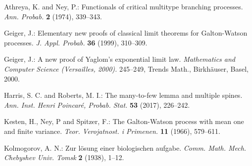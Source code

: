 \documentclass[ECP]{ejpecp} %
\begin{document}
\begin{thebibliography}{99}
	



  
  Athreya, K.  and  Ney, P.:
  Functionals of critical multitype branching processes.
  \emph{Ann. Probab.} 
  \textbf{2} (1974), 339--343.

  Geiger, J.:
  Elementary new proofs of classical limit theorems for Galton-Watson processes.
  \emph{J. Appl. Probab.}
  \textbf{36} (1999), 310--309.

  Geiger, J.:
  A new proof of Yaglom's exponential limit law.
  \emph{Mathematics and Computer Science  (Versailles, 2000).}
  245--249, Trends Math., Birkh{\"a}user, Basel, 2000.

  Harris, S. C. and Roberts, M. I.:
  The many-to-few lemma and multiple spines.
  \emph{Ann.  Inst. Henri Poincar{\'e}, Probab. Stat.}
  \textbf{53} (2017), 226--242.

  Kesten, H.,  Ney, P and Spitzer, F.:
  The Galton-Watson process with mean one and finite variance.
  \emph{Teor. Verojatnost. i Primenen.}
  \textbf{11} (1966), 579--611.

  Kolmogorov, A. N.:
  Zur l{\"o}sung einer biologischen aufgabe.
  \emph{Comm. Math. Mech. Chebyshev Univ. Tomsk}
  \textbf{2} (1938), 1--12.
  

\end{thebibliography}
\end{document}
